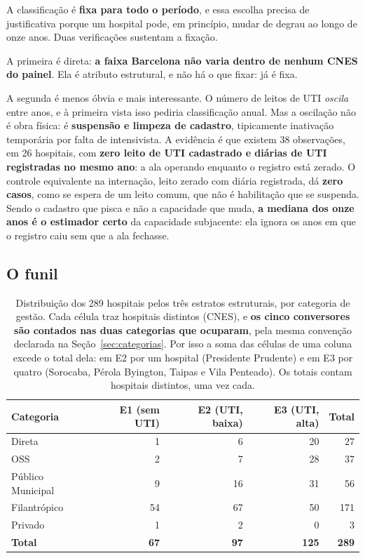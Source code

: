 A classificação é \textbf{fixa para todo o período}, e essa escolha precisa
de justificativa porque um hospital pode, em princípio, mudar de degrau ao
longo de onze anos. Duas verificações sustentam a fixação.

A primeira é direta: \textbf{a faixa Barcelona não varia dentro de nenhum
CNES do painel}. Ela é atributo estrutural, e não há o que fixar: já é
fixa.

A segunda é menos óbvia e mais interessante. O número de leitos de UTI
\emph{oscila} entre anos, e à primeira vista isso pediria classificação
anual. Mas a oscilação não é obra física: é \textbf{suspensão e limpeza de
cadastro}, tipicamente inativação temporária por falta de intensivista. A
evidência é que existem 38 observações, em 26 hospitais, com \textbf{zero
leito de UTI cadastrado e diárias de UTI registradas no mesmo ano}: a ala
operando enquanto o registro está zerado. O controle equivalente na
internação, leito zerado com diária registrada, dá \textbf{zero casos}, como
se espera de um leito comum, que não é habilitação que se suspenda. Sendo o
cadastro que pisca e não a capacidade que muda, \textbf{a mediana dos onze
anos é o estimador certo} da capacidade subjacente: ela ignora os anos em
que o registro caiu sem que a ala fechasse.

\subsection{O funil}

\begin{table}[H]
\centering
\caption{Distribuição dos 289 hospitais pelos três estratos estruturais,
por categoria de gestão. Cada célula traz hospitais distintos (CNES), e
\textbf{os cinco conversores são contados nas duas categorias que ocuparam},
pela mesma convenção declarada na Seção~\ref{sec:categorias}. Por isso a
soma das células de uma coluna excede o total dela: em E2 por um hospital
(Presidente Prudente) e em E3 por quatro (Sorocaba, Pérola Byington, Taipas
e Vila Penteado). Os totais contam hospitais distintos, uma vez cada.}
\label{tab:funilestratos}
\small
\begin{tabular}{lrrrr}
\toprule
Categoria & E1 (sem UTI) & E2 (UTI, baixa) & E3 (UTI, alta) & Total \\
\midrule
Direta            &  1 &  6 &  20 &  27 \\
OSS               &  2 &  7 &  28 &  37 \\
Público Municipal &  9 & 16 &  31 &  56 \\
Filantrópico      & 54 & 67 &  50 & 171 \\
Privado           &  1 &  2 &   0 &   3 \\
\midrule
\textbf{Total}    & \textbf{67} & \textbf{97} & \textbf{125} & \textbf{289} \\
\bottomrule
\end{tabular}
\end{table}

